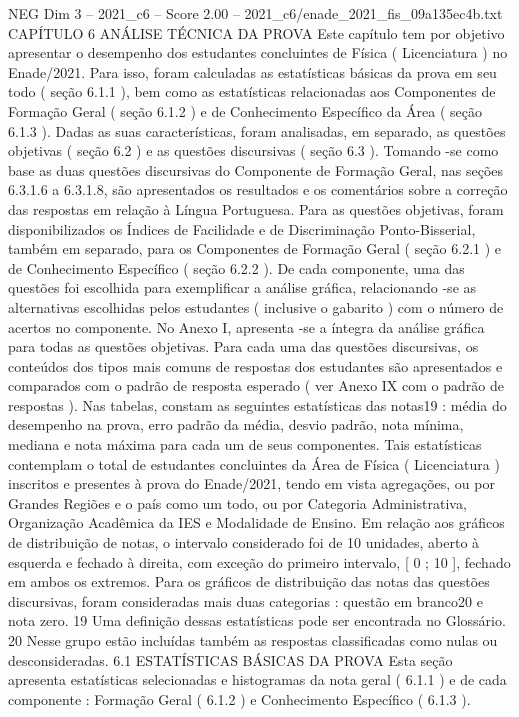 \begin{textsample}{NEG Dim 3 – 2021\_c6 – Score 2.00 – 2021\_c6/enade\_2021\_fis\_09a135ec4b.txt}  \label{ex:f3_neg_237}
CAPÍTULO 6 ANÁLISE TÉCNICA DA PROVA Este capítulo tem por objetivo apresentar o desempenho dos estudantes concluintes de Física ( Licenciatura ) no Enade/2021.
Para isso, foram calculadas as estatísticas básicas da prova em seu todo ( seção 6.1.1 ), bem como as estatísticas relacionadas aos Componentes de Formação Geral ( seção 6.1.2 ) e de Conhecimento Específico da Área ( seção 6.1.3 ).
Dadas as suas características, foram analisadas, em separado, as questões objetivas ( seção 6.2 ) e as questões discursivas ( seção 6.3 ).
Tomando -se como base as duas questões discursivas do Componente de Formação Geral, nas seções 6.3.1.6 a 6.3.1.8, são apresentados os resultados e os comentários sobre a correção das respostas em relação à Língua Portuguesa.
Para as questões objetivas, foram disponibilizados os Índices de Facilidade e de Discriminação Ponto-Bisserial, também em separado, para os Componentes de Formação Geral ( seção 6.2.1 ) e de Conhecimento Específico ( seção 6.2.2 ).
De cada componente, uma das questões foi escolhida para exemplificar a análise gráfica, relacionando -se as alternativas escolhidas pelos estudantes ( inclusive o gabarito ) com o número de acertos no componente.
No Anexo I, apresenta -se a íntegra da análise gráfica para todas as questões objetivas.
Para cada uma das questões discursivas, os conteúdos dos tipos mais comuns de respostas dos estudantes são apresentados e comparados com o padrão de resposta esperado ( ver Anexo IX com o padrão de respostas ).
Nas tabelas, constam as seguintes estatísticas das notas19 : média do desempenho na prova, erro padrão da média, desvio padrão, nota mínima, mediana e nota máxima para cada um de seus componentes.
Tais estatísticas contemplam o total de estudantes concluintes da Área de Física ( Licenciatura ) inscritos e presentes à prova do Enade/2021, tendo em vista agregações, ou por Grandes Regiões e o país como um todo, ou por Categoria Administrativa, Organização Acadêmica da IES e Modalidade de Ensino.
Em relação aos gráficos de distribuição de notas, o intervalo considerado foi de 10 unidades, aberto à esquerda e fechado à direita, com exceção do primeiro intervalo, [ 0 ; 10 ], fechado em ambos os extremos.
Para os gráficos de distribuição das notas das questões discursivas, foram consideradas mais duas categorias : questão em branco20 e nota zero. 19 Uma definição dessas estatísticas pode ser encontrada no Glossário. 20 Nesse grupo estão incluídas também as respostas classificadas como nulas ou desconsideradas. 6.1 ESTATÍSTICAS BÁSICAS DA PROVA Esta seção apresenta estatísticas selecionadas e histogramas da nota geral ( 6.1.1 ) e de cada componente : Formação Geral ( 6.1.2 ) e Conhecimento Específico ( 6.1.3 ).

\end{textsample}
